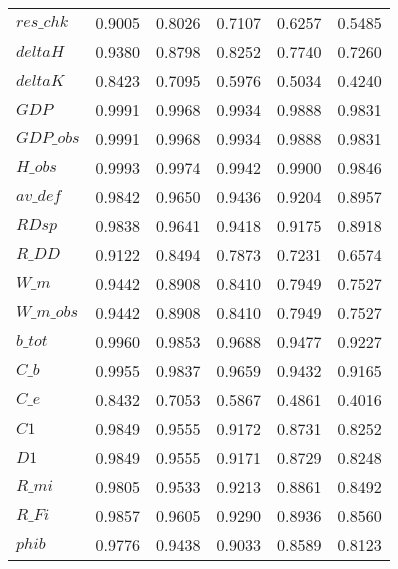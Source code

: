\begin{center}
\begin{longtable}{lccccc}
$res\_chk           $	 & 	    0.9005	 & 	    0.8026	 & 	    0.7107	 & 	    0.6257	 & 	    0.5485 \\ 
$deltaH             $	 & 	    0.9380	 & 	    0.8798	 & 	    0.8252	 & 	    0.7740	 & 	    0.7260 \\ 
$deltaK             $	 & 	    0.8423	 & 	    0.7095	 & 	    0.5976	 & 	    0.5034	 & 	    0.4240 \\ 
$GDP                $	 & 	    0.9991	 & 	    0.9968	 & 	    0.9934	 & 	    0.9888	 & 	    0.9831 \\ 
$GDP\_obs           $	 & 	    0.9991	 & 	    0.9968	 & 	    0.9934	 & 	    0.9888	 & 	    0.9831 \\ 
$H\_obs             $	 & 	    0.9993	 & 	    0.9974	 & 	    0.9942	 & 	    0.9900	 & 	    0.9846 \\ 
$av\_def            $	 & 	    0.9842	 & 	    0.9650	 & 	    0.9436	 & 	    0.9204	 & 	    0.8957 \\ 
$RDsp               $	 & 	    0.9838	 & 	    0.9641	 & 	    0.9418	 & 	    0.9175	 & 	    0.8918 \\ 
$R\_DD              $	 & 	    0.9122	 & 	    0.8494	 & 	    0.7873	 & 	    0.7231	 & 	    0.6574 \\ 
$W\_m               $	 & 	    0.9442	 & 	    0.8908	 & 	    0.8410	 & 	    0.7949	 & 	    0.7527 \\ 
$W\_m\_obs          $	 & 	    0.9442	 & 	    0.8908	 & 	    0.8410	 & 	    0.7949	 & 	    0.7527 \\ 
$b\_tot             $	 & 	    0.9960	 & 	    0.9853	 & 	    0.9688	 & 	    0.9477	 & 	    0.9227 \\ 
$C\_b               $	 & 	    0.9955	 & 	    0.9837	 & 	    0.9659	 & 	    0.9432	 & 	    0.9165 \\ 
$C\_e               $	 & 	    0.8432	 & 	    0.7053	 & 	    0.5867	 & 	    0.4861	 & 	    0.4016 \\ 
$C1                 $	 & 	    0.9849	 & 	    0.9555	 & 	    0.9172	 & 	    0.8731	 & 	    0.8252 \\ 
$D1                 $	 & 	    0.9849	 & 	    0.9555	 & 	    0.9171	 & 	    0.8729	 & 	    0.8248 \\ 
$R\_mi              $	 & 	    0.9805	 & 	    0.9533	 & 	    0.9213	 & 	    0.8861	 & 	    0.8492 \\ 
$R\_Fi              $	 & 	    0.9857	 & 	    0.9605	 & 	    0.9290	 & 	    0.8936	 & 	    0.8560 \\ 
$phib               $	 & 	    0.9776	 & 	    0.9438	 & 	    0.9033	 & 	    0.8589	 & 	    0.8123 \\ 

\end{longtable}
\end{center}

